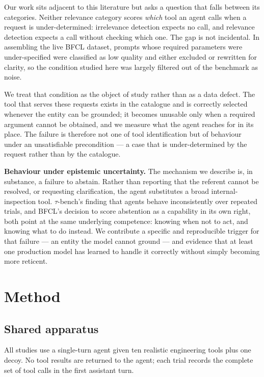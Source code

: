 \documentclass[
  11pt]{article}
\begin{document}
Our work sits adjacent to this literature but asks a question that falls
between its categories. Neither relevance category scores \emph{which}
tool an agent calls when a request is under-determined: irrelevance
detection expects no call, and relevance detection expects a call
without checking which one. The gap is not incidental. In assembling the
live BFCL dataset, prompts whose required parameters were
under-specified were classified as low quality and either excluded or
rewritten for clarity, so the condition studied here was largely
filtered out of the benchmark as noise.

We treat that condition as the object of study rather than as a data
defect. The tool that serves these requests exists in the catalogue and
is correctly selected whenever the entity can be grounded; it becomes
unusable only when a required argument cannot be obtained, and we
measure what the agent reaches for in its place. The failure is
therefore not one of tool identification but of behaviour under an
unsatisfiable precondition --- a case that is under-determined by the
request rather than by the catalogue.

\textbf{Behaviour under epistemic uncertainty.} The mechanism we
describe is, in substance, a failure to abstain. Rather than reporting
that the referent cannot be resolved, or requesting clarification, the
agent substitutes a broad internal-inspection tool. \(\tau\)-bench's
finding that agents behave inconsistently over repeated trials, and
BFCL's decision to score abstention as a capability in its own right,
both point at the same underlying competence: knowing when not to act,
and knowing what to do instead. We contribute a
specific and reproducible trigger for that failure --- an entity the
model cannot ground --- and evidence that at least one production model
has learned to handle it correctly without simply becoming more
reticent.

\hypertarget{method}{%
\section{Method}\label{method}}

\hypertarget{shared-apparatus}{%
\subsection{Shared apparatus}\label{shared-apparatus}}

All studies use a single-turn agent given ten realistic engineering
tools plus one decoy. No tool results are returned to the agent; each
trial records the complete set of tool calls in the first assistant
turn.
\end{document}
